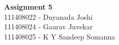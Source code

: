\documentclass[main.tex]{subfiles}
\begin{document}
\begin{titlepage}

\begin{center}
  \LARGE{\bf{Assignment 5\\}}
  \horrule{0.4pt}
  111408022 - Dnyanada Joshi \\
  111408024 - Gaurav Juvekar \\
  111408025 - K Y Sandeep Somanna \\
\end{center}
\horrule{0.4pt}
\end{titlepage}
\end{document}
